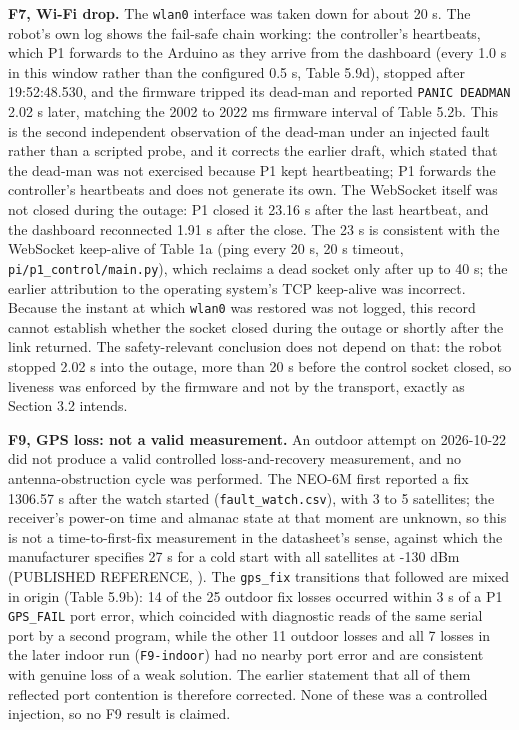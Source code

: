 \textbf{F7, Wi-Fi drop.} The \texttt{wlan0} interface was taken down for about 20 s. The robot's own log shows the fail-safe chain working: the controller's heartbeats, which P1 forwards to the Arduino as they arrive from the dashboard (every 1.0 s in this window rather than the configured 0.5 s, Table 5.9d), stopped after 19:52:48.530, and the firmware tripped its dead-man and reported \texttt{PANIC DEADMAN} 2.02 s later, matching the 2002 to 2022 ms firmware interval of Table 5.2b. This is the second independent observation of the dead-man under an injected fault rather than a scripted probe, and it corrects the earlier draft, which stated that the dead-man was not exercised because P1 kept heartbeating; P1 forwards the controller's heartbeats and does not generate its own. The WebSocket itself was not closed during the outage: P1 closed it 23.16 s after the last heartbeat, and the dashboard reconnected 1.91 s after the close. The 23 s is consistent with the WebSocket keep-alive of Table 1a (ping every 20 s, 20 s timeout, \texttt{pi/p1\_control/main.py}), which reclaims a dead socket only after up to 40 s; the earlier attribution to the operating system's TCP keep-alive was incorrect. Because the instant at which \texttt{wlan0} was restored was not logged, this record cannot establish whether the socket closed during the outage or shortly after the link returned. The safety-relevant conclusion does not depend on that: the robot stopped 2.02 s into the outage, more than 20 s before the control socket closed, so liveness was enforced by the firmware and not by the transport, exactly as Section 3.2 intends.

\textbf{F9, GPS loss: not a valid measurement.} An outdoor attempt on 2026-10-22 did not produce a valid controlled loss-and-recovery measurement, and no antenna-obstruction cycle was performed. The NEO-6M first reported a fix 1306.57 s after the watch started (\texttt{fault\_watch.csv}), with 3 to 5 satellites; the receiver's power-on time and almanac state at that moment are unknown, so this is not a time-to-first-fix measurement in the datasheet's sense, against which the manufacturer specifies 27 s for a cold start with all satellites at -130 dBm (PUBLISHED REFERENCE, \cite{ublox_neo6}). The \texttt{gps\_fix} transitions that followed are mixed in origin (Table 5.9b): 14 of the 25 outdoor fix losses occurred within 3 s of a P1 \texttt{GPS\_FAIL} port error, which coincided with diagnostic reads of the same serial port by a second program, while the other 11 outdoor losses and all 7 losses in the later indoor run (\texttt{F9-indoor}) had no nearby port error and are consistent with genuine loss of a weak solution. The earlier statement that all of them reflected port contention is therefore corrected. None of these was a controlled injection, so no F9 result is claimed.

